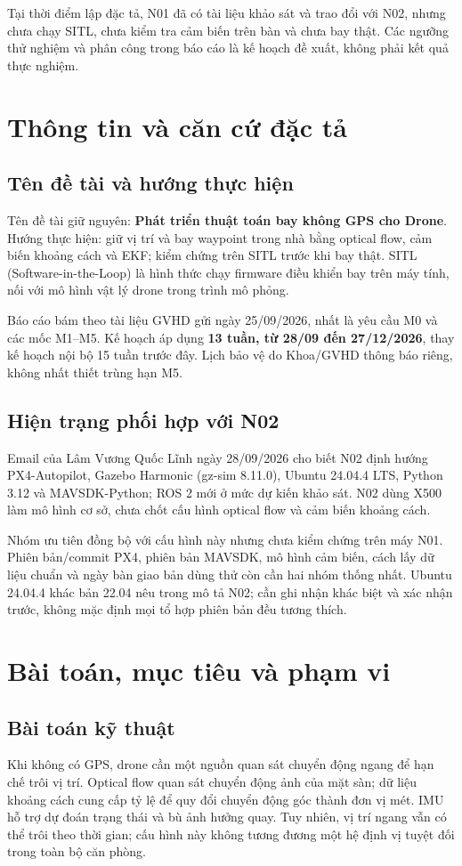 \documentclass[a4paper,12pt]{article}
\begin{document}
Tại thời điểm lập đặc tả, N01 đã có tài liệu khảo sát và trao đổi với N02, nhưng chưa chạy SITL, chưa kiểm tra cảm biến trên bàn và chưa bay thật. Các ngưỡng thử nghiệm và phân công trong báo cáo là kế hoạch đề xuất, không phải kết quả thực nghiệm.

\section{Thông tin và căn cứ đặc tả}
\subsection{Tên đề tài và hướng thực hiện}
Tên đề tài giữ nguyên: \textbf{Phát triển thuật toán bay không GPS cho Drone}. Hướng thực hiện: giữ vị trí và bay waypoint trong nhà bằng optical flow, cảm biến khoảng cách và EKF; kiểm chứng trên SITL trước khi bay thật. SITL (Software-in-the-Loop) là hình thức chạy firmware điều khiển bay trên máy tính, nối với mô hình vật lý drone trong trình mô phỏng.

Báo cáo bám theo tài liệu GVHD gửi ngày 25/09/2026, nhất là yêu cầu M0 và các mốc M1--M5\cite{assignment}. Kế hoạch áp dụng \textbf{13 tuần, từ 28/09 đến 27/12/2026}, thay kế hoạch nội bộ 15 tuần trước đây. Lịch bảo vệ do Khoa/GVHD thông báo riêng, không nhất thiết trùng hạn M5.

\subsection{Hiện trạng phối hợp với N02}
Email của Lâm Vương Quốc Lĩnh ngày 28/09/2026 cho biết N02 định hướng PX4-Autopilot, Gazebo Harmonic (gz-sim 8.11.0), Ubuntu 24.04.4 LTS, Python 3.12 và MAVSDK-Python; ROS 2 mới ở mức dự kiến khảo sát. N02 dùng X500 làm mô hình cơ sở, chưa chốt cấu hình optical flow và cảm biến khoảng cách\cite{n02mail}.

Nhóm ưu tiên đồng bộ với cấu hình này nhưng chưa kiểm chứng trên máy N01. Phiên bản/commit PX4, phiên bản MAVSDK, mô hình cảm biến, cách lấy dữ liệu chuẩn và ngày bàn giao bản dùng thử còn cần hai nhóm thống nhất. Ubuntu 24.04.4 khác bản 22.04 nêu trong mô tả N02; cần ghi nhận khác biệt và xác nhận trước, không mặc định mọi tổ hợp phiên bản đều tương thích.

\section{Bài toán, mục tiêu và phạm vi}
\subsection{Bài toán kỹ thuật}
Khi không có GPS, drone cần một nguồn quan sát chuyển động ngang để hạn chế trôi vị trí. Optical flow quan sát chuyển động ảnh của mặt sàn; dữ liệu khoảng cách cung cấp tỷ lệ để quy đổi chuyển động góc thành đơn vị mét. IMU hỗ trợ dự đoán trạng thái và bù ảnh hưởng quay\cite{flow,ekf}. Tuy nhiên, vị trí ngang vẫn có thể trôi theo thời gian; cấu hình này không tương đương một hệ định vị tuyệt đối trong toàn bộ căn phòng.
\end{document}

